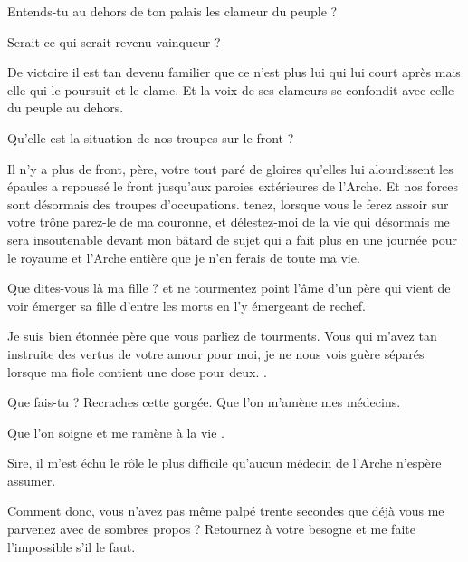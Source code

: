 \begin{drama}
  \elaspeaks Entends-tu au dehors de ton palais les clameur du peuple ?

  \roispeaks Serait-ce \elena qui serait revenu vainqueur ?

  \elaspeaks De victoire il est tan devenu familier que ce n’est plus lui qui lui court après mais elle qui le poursuit et le clame. Et la voix de ses clameurs se confondit avec celle du peuple au dehors.

  \roispeaks Qu’elle est la situation de nos troupes sur le front ?

  \elaspeaks Il n’y a plus de front, père, votre \elena tout paré de gloires qu’elles lui alourdissent les épaules a repoussé le front jusqu’aux paroies extérieures de l’Arche. Et nos forces sont désormais des troupes d’occupations.  tenez, lorsque vous le ferez assoir sur votre trône parez-le de ma couronne, et délestez-moi de la vie qui désormais me sera insoutenable devant mon bâtard de sujet qui a fait plus en une journée pour le royaume et l’Arche entière que je n’en ferais de toute ma vie.

  \roispeaks Que dites-vous là ma fille ? et ne tourmentez point l’âme d’un père qui vient de voir émerger sa fille d’entre les morts en l’y émergeant de rechef.

  \elaspeaks Je suis bien étonnée père que vous parliez de tourments. Vous qui m’avez tan instruite des vertus de votre amour pour moi, je ne nous vois guère séparés lorsque ma fiole contient une dose pour deux. .

  \roispeaks Que fais-tu \princesse{} ? Recraches cette gorgée.  Que l’on m’amène mes médecins.


  \roispeaks Que l’on soigne et me ramène à la vie \princesse.




  \medecinspeaks Sire, il m’est échu le rôle le plus difficile qu’aucun médecin de l’Arche n’espère assumer. 

  \roispeaks Comment donc, vous n’avez pas même palpé trente secondes que déjà vous me parvenez avec de sombres propos ? Retournez à votre besogne et me faite l’impossible s’il le faut.


\end{drama}
